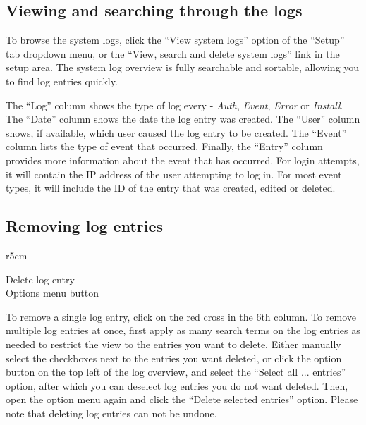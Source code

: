 \subsection{Viewing and searching through the logs}
To browse the system logs, click the ``View system logs'' option of the ``Setup'' tab dropdown menu,
 or the ``View, search and delete system logs'' link in the setup area.
The system log overview is fully searchable and sortable, allowing you to find log entries quickly.

The ``Log'' column shows the type of log every - \emph{Auth}, \emph{Event}, \emph{Error} or \emph{Install}.
The ``Date'' column shows the date the log entry was created.
The ``User'' column shows, if available, which user caused the log entry to be created.
The ``Event'' column lists the type of event that occurred.
Finally, the ``Entry'' column provides more information about the event that has occurred.
For login attempts, it will contain the IP address of the user attempting to log in.
For most event types, it will include the ID of the entry that was created, edited or deleted.



\subsection{Removing log entries}
\begin{wrapfigure}[4]{r}{5cm} %
  \vspace{-25pt}
  \begin{framed}
     Delete log entry\\
     Options menu button
  \end{framed}
\end{wrapfigure}
To remove a single log entry, click on the red cross in the 6th column.
To remove multiple log entries at once, first apply as many search terms on the log entries as needed to restrict the view to the entries you want to delete.
Either manually select the checkboxes next to the entries you want deleted,
 or click the option button on the top left of the log overview, and select the ``Select all ... entries'' option,
 after which you can deselect log entries you do not want deleted.
Then, open the option menu again and click the ``Delete selected entries'' option.
Please note that deleting log entries can not be undone.





